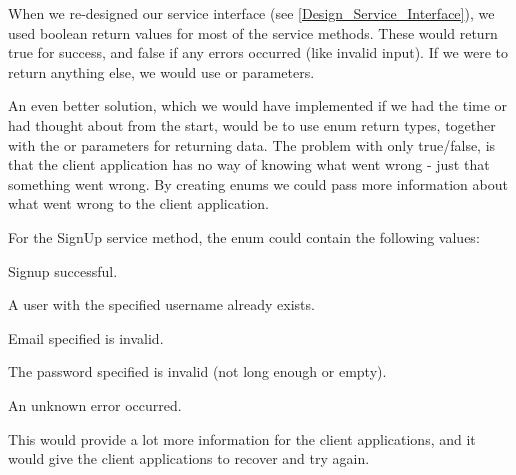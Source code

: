 When we re-designed our service interface (see \ref{Design_Service_Interface}), we used boolean return values for most of the service methods. These would return true for success, and false if any errors occurred (like invalid input). If we were to return anything else, we would use  or  parameters.

An even better solution, which we would have implemented if we had the time or had thought about from the start, would be to use enum return types, together with the  or  parameters for returning data. The problem with only true/false, is that the client application has no way of knowing what went wrong - just that something went wrong. By creating enums we could pass more information about what went wrong to the client application.

For the SignUp service method, the enum could contain the following values:

\begin{my_description}
\item[Success] Signup successful.
\item[UsernameInUse] A user with the specified username already exists.
\item[InvalidEmail] Email specified is invalid.
\item[InvalidPassword] The password specified is invalid (not long enough or empty).
\item[Error] An unknown error occurred.
\end{my_description}

This would provide a lot more information for the client applications, and it would give the client applications to recover and try again.